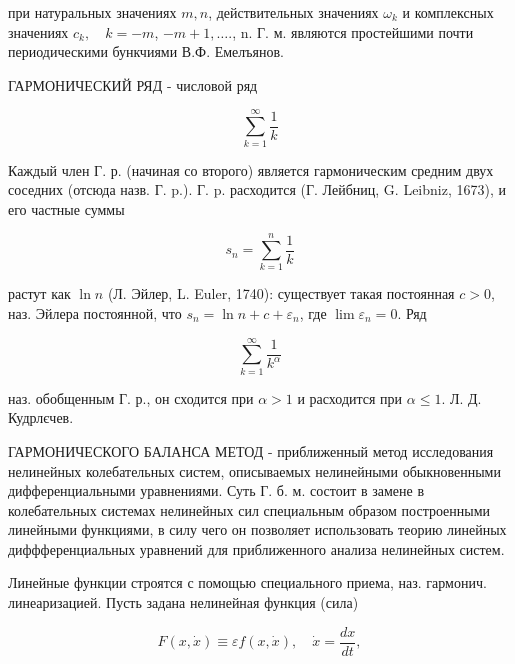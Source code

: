 \documentclass[10pt]{article}
\begin{document}
при натуральных значениях $m, n$, действительных значениях $\omega_{k}$ и комплексных значениях $c_{k}, \quad k=-m$, $-m+1, \ldots .$, n. Г. м. являются простейшими почти периодическими бункчиями В.Ф. Емелъянов.



ГАРМОНИЧЕСКИЙ РЯД - числовой ряд



\[

\sum_{k=1}^{\infty} \frac{1}{k}

\]



Каждый член Г. р. (начиная со второго) является гармоническим средним двух соседних (отсюда назв. Г. p.). Г. p. расходится (Г. Лейбниц, G. Leibniz, 1673), и его частные суммы



\[

s_{n}=\sum_{k=1}^{n} \frac{1}{k}

\]



растут как $\ln n$ (Л. Эйлер, L. Euler, 1740): существует такая постоянная $c>0$, наз. Эйлера постоянной, что $s_{n}=\ln n+c+\varepsilon_{n}$, где $\lim \varepsilon_{n}=0$. Ряд



\[

\sum_{k=1}^{\infty} \frac{1}{k^{\alpha}}

\]



наз. обобщенным Г. р., он сходится при $\alpha>1$ и расходится при $\alpha \leqslant 1$. Л. Д. Кудрлєчев.



ГАРМОНИЧЕСКОГО БАЛАНСА МЕТОД - приближенный метод исследования нелинейных колебательных систем, описываемых нелинейными обыкновенными дифференциальными уравнениями. Суть Г. б. м. состоит в замене в колебательных системах нелинейных сил специальным образом построенными линейными функциями, в силу чего он позволяет использовать теорию линейных диффференциальных уравнений для приближенного анализа нелинейных систем.



Линейные функции строятся с помощью специального приема, наз. гармонич. линеаризацией. Пусть задана нелинейная функция (сила)



\[

F(x, \dot{x}) \equiv \varepsilon f(x, \dot{x}), \quad \dot{x}=\frac{d x}{d t},

\]
\end{document}
